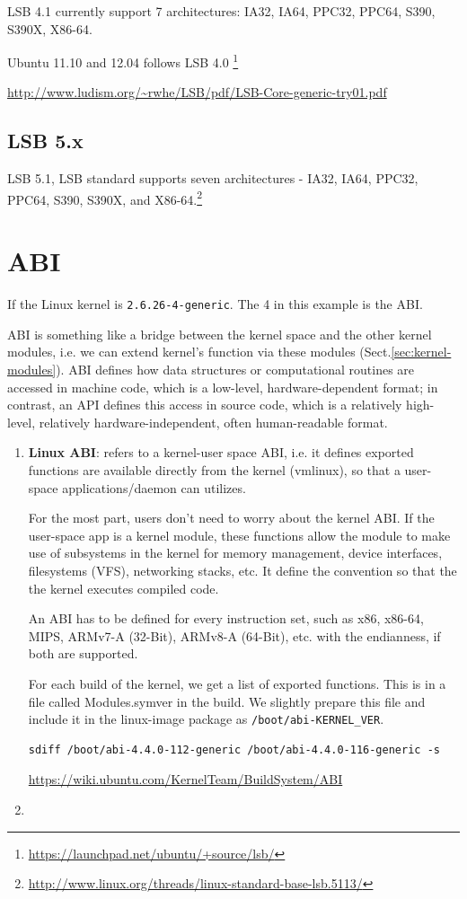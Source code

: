 LSB 4.1 currently support 7 architectures:  IA32, IA64, PPC32, PPC64, S390,
S390X, X86-64.

Ubuntu 11.10 and 12.04 follows LSB 4.0
\footnote{\url{https://launchpad.net/ubuntu/+source/lsb/}}


\url{http://www.ludism.org/~rwhe/LSB/pdf/LSB-Core-generic-try01.pdf}

\subsection{LSB 5.x}
\label{sec:LSB_5.x}

LSB 5.1, LSB standard supports seven architectures - IA32, IA64, PPC32, PPC64,
S390, S390X, and
X86-64.\footnote{\url{http://www.linux.org/threads/linux-standard-base-lsb.5113/}}

\section{ABI}
\label{sec:ABI}

If the Linux kernel is \verb!2.6.26-4-generic!. The 4 in this example is the
ABI.

ABI is something like a bridge between the kernel space and the other kernel
modules, i.e. we can extend kernel's function via these modules
(Sect.\ref{sec:kernel-modules}). ABI defines how data structures or
computational routines are accessed in machine code, which is a low-level,
hardware-dependent format; in contrast, an API defines this access in source
code, which is a relatively high-level, relatively hardware-independent, often
human-readable format.
\begin{enumerate}
  \item {\bf Linux ABI}:
  refers to a kernel-user space ABI, i.e. it defines exported functions are
  available directly from the kernel (vmlinux), so that a user-space
  applications/daemon can utilizes. 
  
  For the most part, users don't need to worry about the kernel ABI.
  If the user-space app is a kernel module, these functions allow the module to
  make use of subsystems in the kernel for memory management, device interfaces,
  filesystems (VFS), networking stacks, etc.
  It define the convention so that the the kernel executes compiled code.
  
  An ABI has to be defined for every instruction set, such as x86, x86-64, MIPS,
  ARMv7-A (32-Bit), ARMv8-A (64-Bit), etc. with the endianness, if both are supported.

For each build of the kernel, we get a list of exported functions. This is in a
file called Modules.symver in the build. We slightly prepare this file and
include it in the linux-image package as \verb!/boot/abi-KERNEL_VER!.
\begin{verbatim}
sdiff /boot/abi-4.4.0-112-generic /boot/abi-4.4.0-116-generic -s
\end{verbatim}
\url{https://wiki.ubuntu.com/KernelTeam/BuildSystem/ABI}

  \item 
\end{enumerate}

